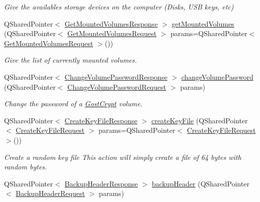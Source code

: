 \begin{DoxyCompactItemize}
\begin{DoxyCompactList}\small\item\em Give the availables storage devices on the computer (Disks, U\+SB keys, etc) \end{DoxyCompactList}\item 
Q\+Shared\+Pointer$<$ \hyperlink{struct_gost_crypt_1_1_core_1_1_get_mounted_volumes_response}{Get\+Mounted\+Volumes\+Response} $>$ \hyperlink{class_gost_crypt_1_1_core_1_1_core_base_a2f6d3f10b68a704690fa1a8843f724dd}{get\+Mounted\+Volumes} (Q\+Shared\+Pointer$<$ \hyperlink{struct_gost_crypt_1_1_core_1_1_get_mounted_volumes_request}{Get\+Mounted\+Volumes\+Request} $>$ params=Q\+Shared\+Pointer$<$ \hyperlink{struct_gost_crypt_1_1_core_1_1_get_mounted_volumes_request}{Get\+Mounted\+Volumes\+Request} $>$())
\begin{DoxyCompactList}\small\item\em Give the list of currently mounted volumes. \end{DoxyCompactList}\item 
Q\+Shared\+Pointer$<$ \hyperlink{struct_gost_crypt_1_1_core_1_1_change_volume_password_response}{Change\+Volume\+Password\+Response} $>$ \hyperlink{class_gost_crypt_1_1_core_1_1_core_base_a8add14f79b2676e0015ee00a7ea4c96a}{change\+Volume\+Password} (Q\+Shared\+Pointer$<$ \hyperlink{struct_gost_crypt_1_1_core_1_1_change_volume_password_request}{Change\+Volume\+Password\+Request} $>$ params)
\begin{DoxyCompactList}\small\item\em Change the password of a \hyperlink{namespace_gost_crypt}{Gost\+Crypt} volume. \end{DoxyCompactList}\item 
Q\+Shared\+Pointer$<$ \hyperlink{struct_gost_crypt_1_1_core_1_1_create_key_file_response}{Create\+Key\+File\+Response} $>$ \hyperlink{class_gost_crypt_1_1_core_1_1_core_base_a6db58096a7fc5ed13c20dc0b7ca4abdb}{create\+Key\+File} (Q\+Shared\+Pointer$<$ \hyperlink{struct_gost_crypt_1_1_core_1_1_create_key_file_request}{Create\+Key\+File\+Request} $>$ params=Q\+Shared\+Pointer$<$ \hyperlink{struct_gost_crypt_1_1_core_1_1_create_key_file_request}{Create\+Key\+File\+Request} $>$())
\begin{DoxyCompactList}\small\item\em Create a random key file This action will simply create a file of 64 bytes with random bytes. \end{DoxyCompactList}\item 
Q\+Shared\+Pointer$<$ \hyperlink{struct_gost_crypt_1_1_core_1_1_backup_header_response}{Backup\+Header\+Response} $>$ \hyperlink{class_gost_crypt_1_1_core_1_1_core_base_af5193ba2f99911cb8044038576462d3d}{backup\+Header} (Q\+Shared\+Pointer$<$ \hyperlink{struct_gost_crypt_1_1_core_1_1_backup_header_request}{Backup\+Header\+Request} $>$ params)

\end{DoxyCompactItemize}
